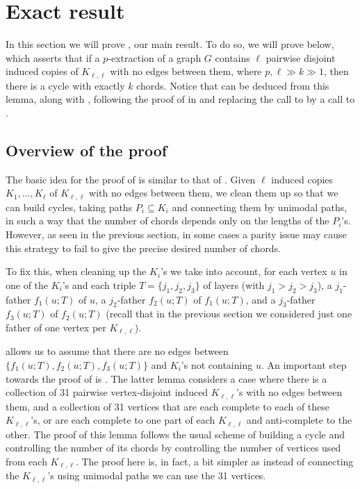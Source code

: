 \documentclass[11pt,english]{article}
\theoremstyle{plain}
\theoremstyle{definition}
\theoremstyle{remark}
\begin{document}
\section{Exact result} \label{sec:exact}
    In this section we will prove , our main result. To do so, we will prove  below, which asserts that if a $p$-extraction of a graph $G$ contains $\ell$ pairwise disjoint induced copies of $K_{\ell, \ell}$ with no edges between them, where $p, \ell \gg k \gg 1$, then there is a cycle with exactly $k$ chords. Notice that  can be deduced from this lemma, along with , following the proof of  in  and replacing the call to  by a call to .
    
    \subsection{Overview of the proof}
        The basic idea for the proof of  is similar to that of . Given $\ell$ induced copies $K_1, \ldots, K_{\ell}$ of $K_{\ell, \ell}$ with no edges between them, we clean them up so that we can build cycles, taking paths $P_i \subseteq K_i$ and connecting them by unimodal paths, in such a way that the number of chords depends only on the lengths of the $P_i$'s. However, as seen in the previous section, in some cases a parity issue may cause this strategy to fail to give the precise desired number of chords. 
        
        To fix this, when cleaning up the $K_i$'s we take into account, for each vertex $u$ in one of the $K_i$'s and each triple $T = \{j_1, j_2, j_3\}$ of layers (with $j_1 > j_2 > j_3$), a $j_1$-father $f_1(u;T)$ of $u$, a $j_2$-father $f_2(u;T)$ of $f_1(u;T)$, and a $j_3$-father $f_3(u;T)$ of $f_2(u;T)$ (recall that in the previous section we considered just one father of one vertex per $K_{\ell, \ell}$). 
        
         allows us to assume that there are no edges between $\{f_1(u; T), f_2(u; T), f_3(u;T)\}$ and $K_i$'s not containing $u$. An important step towards the proof of  is . The latter lemma considers a case where there is a collection of 31 pairwise vertex-disjoint induced $K_{\ell,\ell}$'s with no edges between them, and a collection of 31 vertices that are each complete to each of these $K_{\ell, \ell}$'s, or are each complete to one part of each $K_{\ell, \ell}$ and anti-complete to the other. The proof of this lemma follows the usual scheme of building a cycle and controlling the number of its chords by controlling the number of vertices used from each $K_{\ell, \ell}$. 
        The proof here is, in fact, a bit simpler as instead of connecting the $K_{\ell, \ell}$'s using unimodal paths we can use the 31 vertices.
        
\end{document}
